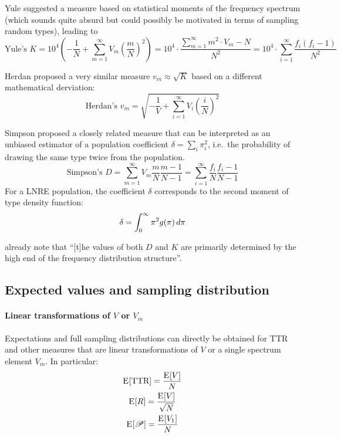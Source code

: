 \documentclass[a4paper]{article}
\begin{document}
Yule suggested a measure based on statistical moments of the frequency
spectrum (which sounds quite absurd but could possibly be motivated in
terms of sampling random types), leading to
\begin{equation}
  \label{eq:prod:yule-K}
  \text{Yule's } K = 
  10^4 \left(-\frac1N + \sum_{m=1}^{\infty} V_m \left( \frac{m}{N}\right)^2 \right)
  = 10^4 \cdot \frac{\sum_{m=1}^{\infty} m^2\cdot V_m - N}{N^2}
  = 10^4 \cdot \sum_{i=1}^{\infty} \frac{f_i (f_i - 1)}{N^2}
\end{equation}

Herdan proposed a very similar measure $v_m \approx \sqrt{K}$ based on a different
mathematical derviation:
\begin{equation}
  \label{eq:prod:herdan-vm}
  \text{Herdan's } v_m =
  \sqrt{-\frac{1}{V} + \sum_{i=1}^{\infty} V_i \left(\frac{i}{N}\right)^2}
\end{equation}

Simpson proposed a closely related measure that can be interpreted as an
unbiased estimator of a population coefficient
$\delta = \sum_i \pi_i^2$, i.e.\ the probability of drawing the same type
twice from the population.
\begin{equation}
  \label{eq:prod:simpson-D}
  \text{Simpson's } D = \sum_{m=1}^{\infty} V_m \frac{m}{N} \frac{m - 1}{N - 1}
  = \sum_{i=1}^{\infty} \frac{f_i}{N} \frac{f_i-1}{N-1}
\end{equation}
For a LNRE population, the coefficient $\delta$ corresponds to the second
moment of type density function:
\begin{equation}
  \label{eq:prod:tdf-2nd-moment}
  \delta = \int_0^{\infty} \pi^2 g(\pi) \,d\pi
\end{equation}

\citet[124]{Baayen:vanHalteren:Tweedie:96} already note that ``[t]he values of
both $D$ and $K$ are primarily determined by the high end of the frequency
distribution structure''.

\subsection{Expected values and sampling distribution}
\label{sec:prod:expectation}

\paragraph{Linear transformations of $V$ or $V_m$}
Expectations and full sampling distributions can directly be obtained for TTR
and other measures that are linear transformations of $V$ or a single spectrum
element $V_m$.  In particular:
\begin{gather}
  \mathrm{E}_{}[\text{TTR}] = \frac{\mathrm{E}_{}[V]}{N}\\
  \mathrm{E}_{}[R] = \frac{\mathrm{E}_{}[V]}{\sqrt{N}}\\
  \mathrm{E}_{}[\mathscr{P}] = \frac{\mathrm{E}_{}[V_1]}{N}
\end{gather}
\end{document}
